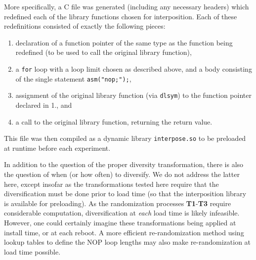More specifically, a C file was generated (including any necessary headers) which redefined each of the library functions chosen for interposition.
Each of these redefinitions consisted of exactly the following pieces:
\begin{enumerate}
	\item declaration of a function pointer of the same type as the function being redefined (to be used to call the original library function),
	\item a \texttt{for} loop with a loop limit chosen as described above, and a body consisting of the single statement \texttt{asm("nop;");},
	\item assignment of the original library function (via \texttt{dlsym}) to the function pointer declared in 1., and
	\item a call to the original library function, returning the return value.
\end{enumerate}
This file was then compiled as a dynamic library \texttt{interpose.so} to be preloaded at runtime before each experiment.

In addition to the question of the proper diversity transformation, there is also the question of when (or how often) to diversify.
We do not address the latter here, except insofar as the transformations tested here require that the diversification must be done prior to load time (so that the interposition library is available for preloading).
As the randomization processes \textbf{T1}-\textbf{T3} require considerable computation, diversification at \textit{each} load time is likely infeasible.
However, one could certainly imagine these transformations being applied at install time, or at each reboot.
A more efficient re-randomization method using lookup tables to define the NOP loop lengths may also make re-randomization at load time possible.